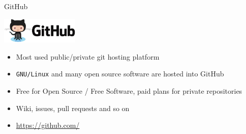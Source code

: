 \begin{frame}[fragile]{GitHub}

\includegraphics[width=10em]{github-logo}

\begin{itemize}
  \item Most used public/private git hosting platform
  \item \texttt{GNU/Linux} and many open source software are hosted into GitHub
  \item Free for Open Source / Free Software, paid plans for private repositories
  \item Wiki, issues, pull requests and so on
  \item[] \url{https://github.com/}
\end{itemize}
\end{frame}
